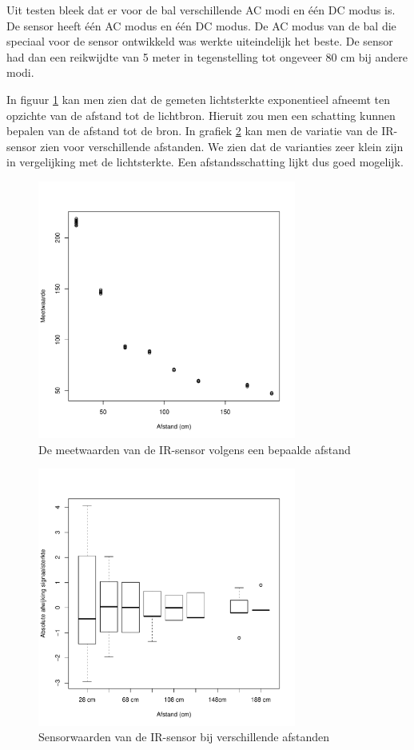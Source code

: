 \documentclass[12pt,a4paper]{report}
\begin{document}
Uit testen bleek dat er voor de bal verschillende AC modi en \'e\'en DC modus is. De sensor heeft \'e\'en AC modus en \'e\'en DC modus. De AC modus van de bal die speciaal voor de sensor ontwikkeld was werkte uiteindelijk het beste. De sensor had dan een reikwijdte van 5 meter in tegenstelling tot ongeveer 80 cm bij andere modi.

In figuur \ref{fig:plotIR} kan men zien dat de gemeten lichtsterkte exponentieel afneemt ten opzichte van de afstand tot de lichtbron.
Hieruit zou men een schatting kunnen bepalen van de afstand tot de bron. In grafiek \ref{fig:boxplotIR} kan men de variatie van de IR-sensor zien voor verschillende afstanden. We zien dat de varianties zeer klein zijn in vergelijking met de lichtsterkte. Een afstandsschatting lijkt dus goed mogelijk.

\begin{figure}[htbp]
  \centering
  \includegraphics[width=85mm]{resources/plotIR.pdf}
  \caption{De meetwaarden van de IR-sensor volgens een bepaalde afstand}
  \label{fig:plotIR}
\end{figure}

\begin{figure}
\begin{center}
 \includegraphics[width=85mm]{./resources/bloxplotIR.pdf}
 \caption{Sensorwaarden van de IR-sensor bij verschillende afstanden}
 \label{fig:boxplotIR}
\end{center}
\end{figure}
\end{document}
